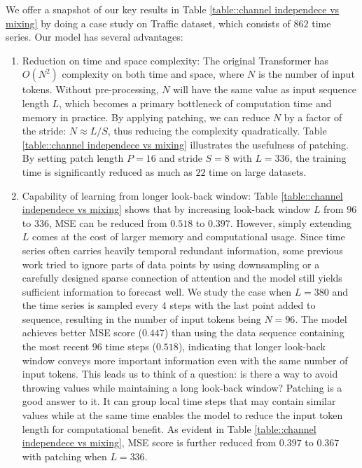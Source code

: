 \documentclass{article} %
\begin{document}
We offer a snapshot of our key results in Table \ref{table::channel independece vs mixing} by doing a case study on Traffic dataset, which consists of $862$ time series. Our model has several advantages:

\begin{enumerate}[leftmargin= 25 pt,itemsep= 5 pt,topsep = 0 pt]
    \item Reduction on time and space complexity: The original Transformer has $O(N^2)$ complexity on both time and space, where $N$ is the number of input tokens. Without pre-processing, $N$ will have the same value as input sequence length $L$, which becomes a primary bottleneck of computation time and memory in practice. By applying patching, we can reduce $N$ by a factor of the stride: $N\approx L/S$, thus reducing the complexity quadratically. Table \ref{table::channel independece vs mixing} illustrates the usefulness of patching. By setting patch length $P=16$ and
    stride $S=8$ with $L=336$, the training time is significantly reduced as much as $22$ time on large datasets.

    \item Capability of learning from longer look-back window: Table \ref{table::channel independece vs mixing} shows that by increasing look-back window $L$ from $96$ to $336$, MSE can be reduced from $0.518$ to $0.397$. However, simply extending $L$ comes at the cost of larger memory and computational usage. 
    Since time series often carries heavily temporal redundant information, some previous work tried to ignore parts of data points by using downsampling or a carefully designed sparse connection of attention \citep{logtrans} and the model still yields sufficient information to forecast well. 
    We study the case when $L=380$ and the time series is sampled every $4$ steps with the last point added to sequence, resulting in the number of input tokens being $N=96$. The model achieves better MSE score ($0.447$) than using the data sequence containing the most recent $96$ time steps ($0.518$), indicating that longer look-back window conveys more important information even with the same number of input tokens. This leads us to think of a question: is there a way to avoid throwing values while maintaining a long look-back window? Patching is a good answer to it. It can group local time steps that may contain similar values while at the same time enables the model to reduce the input token length for computational benefit. As evident in Table \ref{table::channel independece vs mixing}, MSE score is further reduced from $0.397$ to $0.367$ with patching when $L=336$.


\end{enumerate}
\end{document}
